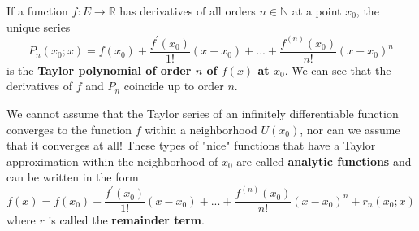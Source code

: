   \begin{definition}
    If a function $f:E \longrightarrow \mathbb{R}$ has derivatives of all orders $n \in \mathbb{N}$ at a point $x_0$, the unique series
    \[P_n (x_0; x) = f(x_0) + \frac{f^\prime (x_0)}{1!} (x-x_0) + ... + \frac{f^{(n)} (x_0)}{n!} (x-x_0)^n\]
    is the \textbf{Taylor polynomial of order $n$ of $f(x)$ at $x_0$}. We can see that the derivatives of $f$ and $P_n$ coincide up to order $n$. 
  \end{definition}

  \begin{definition}
    We cannot assume that the Taylor series of an infinitely differentiable function converges to the function $f$ within a neighborhood $U(x_0)$, nor can we assume that it converges at all! These types of "nice" functions that have a Taylor approximation within the neighborhood of $x_0$ are called \textbf{analytic functions} and can be written in the form 
    \[f(x) =  f(x_0) + \frac{f^\prime (x_0)}{1!} (x-x_0) + ... + \frac{f^{(n)} (x_0)}{n!} (x-x_0)^n + r_n (x_0; x)\]
    where $r$ is called the \textbf{remainder term}. 
  \end{definition}

